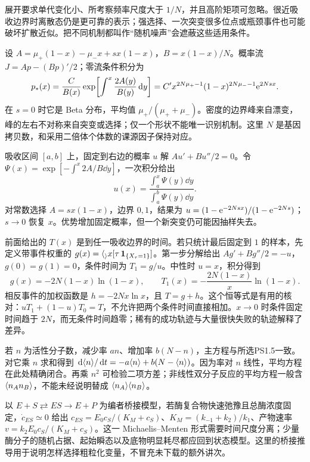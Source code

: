 展开要求单代变化小、所考察频率尺度大于 $1/N$，并且高阶矩项可忽略。很近吸收边界时离散态仍是更可靠的表示；强选择、一次突变很多位点或瓶颈事件也可能破坏扩散近似。把不同机制都叫作“随机噪声”会遮蔽这些适用条件。

设 $A=\mu_+(1-x)-\mu_-x+sx(1-x)$，$B=x(1-x)/N$。概率流 $J=Ap-(Bp)'/2$；零流条件积分为
\[
p_*(x)=\frac C{B(x)}\exp\!\left[\int^x\frac{2A(y)}{B(y)}\,\mathrm d y\right]
=C' x^{2N\mu_+-1}(1-x)^{2N\mu_--1}\mathrm e^{2Nsx}.
\]
在 $s=0$ 时它是 Beta 分布，平均值 $\mu_+/(\mu_++\mu_-)$。密度的边界峰来自漂变，峰的左右不对称来自突变或选择；仅一个形状不能唯一识别机制。这里 $N$ 是基因拷贝数，和采用二倍体个体数的课源因子保持对应。

吸收区间 $[a,b]$ 上，固定到右边的概率 $u$ 解 $Au'+Bu''/2=0$。令 $\Psi(x)=\exp[-\int^x2A/B\dd y]$，一次积分给出
\[
u(x)=\frac{\int_a^x\Psi(y)\dd y}{\int_a^b\Psi(y)\dd y}.
\]
对常数选择 $A=sx(1-x)$，边界 $0,1$，结果为 $u=(1-\mathrm e^{-2Nsx})/(1-\mathrm e^{-2Ns})$；$s\to0$ 恢复 $x$。优势增加固定概率，但一个新突变仍可能因抽样失去。

前面给出的 $T(x)$ 是到任一吸收边界的时间。若只统计最后固定到 $1$ 的样本，先定义带事件权重的 $g(x)=\langle _\rangle x[\tau\,\mathbf1_{\{X_\tau=1\}}]$。第一步分解给出 $Ag'+Bg''/2=-u$，$g(0)=g(1)=0$，条件时间为 $T_1=g/u$。中性时 $u=x$，积分得到
\[
g(x)=-2N(1-x)\ln(1-x),\qquad
T_1(x)=-\frac{2N(1-x)}x\ln(1-x).
\]
相反事件的加权函数是 $h=-2Nx\ln x$，且 $T=g+h$。这个恒等式是有用的核对：$uT_1+(1-u)T_0=T$，不允许把两个条件时间直接相加。$x\to0$ 时条件固定时间趋于 $2N$，而无条件时间趋零；稀有的成功轨迹与大量很快失败的轨迹解释了差异。

若 $n$ 为活性分子数，减少率 $an$、增加率 $b(N-n)$，主方程与所选PS1.5一致。对它乘 $n$ 求和得到 $\,\mathrm d\langle n\rangle/\,\mathrm d t=-a\langle n\rangle+b(N-\langle n\rangle)$。因为率对 $n$ 线性，平均方程在此处精确闭合。再乘 $n^2$ 可检验二项方差；非线性双分子反应的平均方程一般含 $\langle n_A n_B\rangle$，不能未经说明替成 $\langle n_A\rangle\langle n_B\rangle$。

以 $E+S\rightleftarrows ES\to E+P$ 为编者桥接模型，若酶复合物快速弛豫且总酶浓度固定，$\dot c_{ES}\simeq0$ 给出 $c_{ES}=E_0c_S/(K_M+c_S)$、$K_M=(k_{-1}+k_2)/k_1$、产物速率 $v=k_2E_0c_S/(K_M+c_S)$。这一 Michaelis--Menten 形式需要时间尺度分离；少量酶分子的随机占据、起始瞬态以及底物明显耗尽都应回到状态模型。这里的桥接推导用于说明怎样选择粗粒化变量，不冒充未下载的额外讲次。
